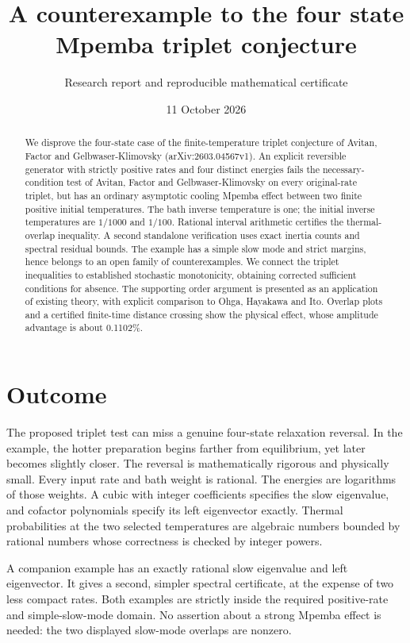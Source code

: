 \documentclass[11pt]{article}
\title{A counterexample to the four state Mpemba triplet conjecture}
\author{Research report and reproducible mathematical certificate}
\date{11 October 2026}
\begin{document}
\maketitle
\begin{abstract}
We disprove the four-state case of the finite-temperature triplet conjecture of Avitan, Factor and Gelbwaser-Klimovsky (arXiv:2603.04567v1). An explicit reversible generator with strictly positive rates and four distinct energies fails the necessary-condition test of Avitan, Factor and Gelbwaser-Klimovsky on every original-rate triplet, but has an ordinary asymptotic cooling Mpemba effect between two finite positive initial temperatures. The bath inverse temperature is one; the initial inverse temperatures are $1/1000$ and $1/100$. Rational interval arithmetic certifies the thermal-overlap inequality. A second standalone verification uses exact inertia counts and spectral residual bounds. The example has a simple slow mode and strict margins, hence belongs to an open family of counterexamples. We connect the triplet inequalities to established stochastic monotonicity, obtaining corrected sufficient conditions for absence. The supporting order argument is presented as an application of existing theory, with explicit comparison to Ohga, Hayakawa and Ito. Overlap plots and a certified finite-time distance crossing show the physical effect, whose amplitude advantage is about 0.1102\%.
\end{abstract}

\section{Outcome}
The proposed triplet test can miss a genuine four-state relaxation reversal. In the example, the hotter preparation begins farther from equilibrium, yet later becomes slightly closer. The reversal is mathematically rigorous and physically small. Every input rate and bath weight is rational. The energies are logarithms of those weights. A cubic with integer coefficients specifies the slow eigenvalue, and cofactor polynomials specify its left eigenvector exactly. Thermal probabilities at the two selected temperatures are algebraic numbers bounded by rational numbers whose correctness is checked by integer powers.

A companion example has an exactly rational slow eigenvalue and left eigenvector. It gives a second, simpler spectral certificate, at the expense of two less compact rates. Both examples are strictly inside the required positive-rate and simple-slow-mode domain. No assertion about a strong Mpemba effect is needed: the two displayed slow-mode overlaps are nonzero.
\end{document}
